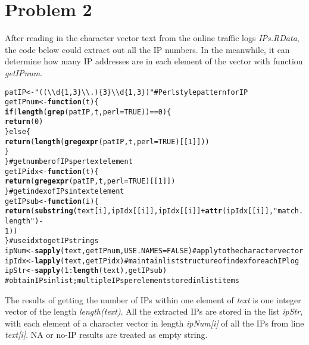 \documentclass{article}\usepackage{graphicx, color}
\makeatletter
\newcommand{\hlfunctioncall}[1]{\textcolor[rgb]{0.501960784313725,0,0.329411764705882}{\textbf{#1}}}%
\newcommand{\hlstring}[1]{\textcolor[rgb]{0.6,0.6,1}{#1}}%
\newcommand{\hlcomment}[1]{\textcolor[rgb]{0.180392156862745,0.6,0.341176470588235}{#1}}%
\newenvironment{kframe}{%
 \def\at@end@of@kframe{}%
 \ifinner\ifhmode%
  \def\at@end@of@kframe{\end{minipage}}%
  \begin{minipage}{\columnwidth}%
 \fi\fi%
 \def\FrameCommand##1{\hskip\@totalleftmargin \hskip-\fboxsep
 \colorbox{shadecolor}{##1}\hskip-\fboxsep
     \hskip-\linewidth \hskip-\@totalleftmargin \hskip\columnwidth}%
 \MakeFramed {\advance\hsize-\width
   \@totalleftmargin\z@ \linewidth\hsize
   \@setminipage}}%
 {\par\unskip\endMakeFramed%
 \at@end@of@kframe}
\newenvironment{knitrout}{}{} %
\makeatother
\begin{document}
\section*{Problem 2}

After reading in the character vector text from the online traffic logs \textit{IPs.RData}, the 
code below could extract out all the IP numbers. In the meanwhile, it can determine how many IP 
addresses are in each element of the vector with function \textit{getIPnum}.

\begin{knitrout}
\color{fgcolor}\begin{kframe}
\begin{alltt}
patIP <- \hlstring{"((\textbackslash{}\textbackslash{}d\{1,3\}\textbackslash{}\textbackslash{}.)\{3\}\textbackslash{}\textbackslash{}d\{1,3\})"}  #Perl style pattern for IP
getIPnum <- \hlfunctioncall{function}(t) \{
    \hlfunctioncall{if} (\hlfunctioncall{length}(\hlfunctioncall{grep}(patIP, t, perl = TRUE)) == 0) \{
        \hlfunctioncall{return}(0)
    \} else \{
        \hlfunctioncall{return}(\hlfunctioncall{length}(\hlfunctioncall{gregexpr}(patIP, t, perl = TRUE)[[1]]))
    \}
\}  \hlcomment{# get number of IPs per text element}
getIPidx <- \hlfunctioncall{function}(t) \{
    \hlfunctioncall{return}(\hlfunctioncall{gregexpr}(patIP, t, perl = TRUE)[[1]])
\}  \hlcomment{# get index of IPs in text element}
getIPsub <- \hlfunctioncall{function}(i) \{
    \hlfunctioncall{return}(\hlfunctioncall{substring}(text[i], ipIdx[[i]], ipIdx[[i]] + \hlfunctioncall{attr}(ipIdx[[i]], \hlstring{"match.length"}) - 
        1))
\}  \hlcomment{# use idx to get IP strings}
ipNum <- \hlfunctioncall{sapply}(text, getIPnum, USE.NAMES = FALSE)  \hlcomment{# apply to the character vector}
ipIdx <- \hlfunctioncall{lapply}(text, getIPidx)  \hlcomment{# maintain list structure of index for each IP log}
ipStr <- \hlfunctioncall{sapply}(1:\hlfunctioncall{length}(text), getIPsub)
\hlcomment{# obtain IPs in list; multiple IPs per element stored in list items}
\end{alltt}
\end{kframe}
\end{knitrout}


The results of getting the number of IPs within one element of \textit{text} is one integer vector of 
the length \textit{length(text)}. All the extracted IPs are stored in the list \textit{ipStr}, 
with each element of a character vector in length \textit{ipNum[i]} of all the IPs from line \textit{text[i]}.
NA or no-IP results are treated as empty string.
\end{document}
